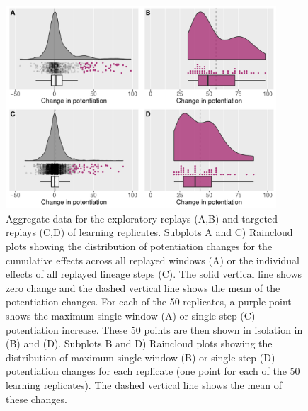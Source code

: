 \begin{figure}[h!]
\begin{center}
\includegraphics[width=0.9\textwidth]{04_learning_extension/media/replays_dists.pdf}
\end{center}
\caption{ 
Aggregate data for the exploratory replays (A,B) and targeted replays (C,D) of learning replicates. 
Subplots A and C) Raincloud plots showing the distribution of potentiation changes for the cumulative effects across all replayed windows (A) or the individual effects of all replayed lineage steps (C).
The solid vertical line shows zero change and the dashed vertical line shows the mean of the potentiation changes. 
For each of the 50 replicates, a purple point shows the maximum single-window (A) or single-step (C) potentiation increase.
These 50 points are then shown in isolation in (B) and (D).
Subplots B and D)  Raincloud plots showing the distribution of maximum single-window (B) or single-step (D) potentiation changes for each replicate (one point for each of the 50 learning replicates). 
The dashed vertical line shows the mean of these changes. 
}\label{fig:replay_distributions}
\end{figure}

